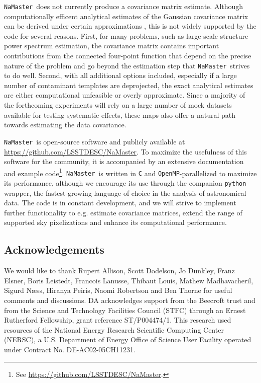 \documentclass[usenatbib]{mnrasb}
\newcommand{\nmt}{{\tt NaMaster}}
\begin{document}
    \nmt~does not currently produce a covariance matrix estimate. Although computationally efficent analytical estimates of the Gaussian covariance matrix can be derived under certain approximations \citep{2004MNRAS.349..603E,2005MNRAS.360.1262B}, this is not widely supported by the code for several reasons. First, for many problems, such as large-scale structure power spectrum estimation, the covariance matrix contains important contributions from the connected four-point function that depend on the precise nature of the problem and go beyond the estimation step that \nmt~strives to do well. Second, with all additional options included, especially if a large number of contaminant templates are deprojected, the exact analytical estimates are either computational unfeasible or overly approximate. Since a majority of the forthcoming experiments will rely on a large number of mock datasets available for testing systematic effects, these maps also offer a natural path towards estimating the data covariance.
    
    \nmt~is open-source software and publicly available at \url{https://github.com/LSSTDESC/NaMaster}. To maximize the usefulness of this software for the community, it is accompanied by an extensive documentation and example code\footnote{See \url{https://github.com/LSSTDESC/NaMaster}.}. \nmt~is written in {\tt C} and {\tt OpenMP}-parallelized to maximize its performance, although we encourage its use through the companion {\tt python} wrapper, the fastest-growing language of choice in the analysis of astronomical data. The code is in constant development, and we will strive to implement further functionality to e.g. estimate covariance matrices, extend the range of supported sky pixelizations and enhance its computational performance.


\subsection*{Acknowledgements}
We would like to thank Rupert Allison, Scott Dodelson, Jo Dunkley, Franz Elsner, Boris Leistedt, Francois Lanusse, Thibaut Louis, Mathew Madhavacheril, Sigurd N\ae ss, Hiranya Peiris, Naomi Robertson and Ben Thorne for useful comments and discussions. DA acknowledges support from the Beecroft trust and from the Science and Technology Facilities Council (STFC) through an Ernest Rutherford Fellowship, grant reference ST/P004474/1. This research used resources of the National Energy Research Scientific Computing Center (NERSC), a U.S. Department of Energy Office of Science User Facility operated under Contract No. DE-AC02-05CH11231.
\end{document}
